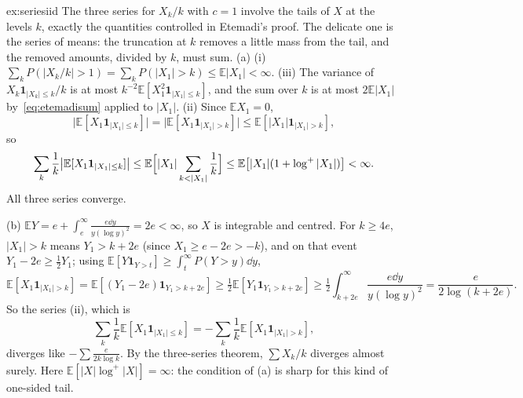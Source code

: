 \begin{solution}{ex:seriesiid}
\idea The three series for $X_k/k$ with $c=1$ involve the tails of $X$ at the levels $k$, exactly the quantities controlled in Etemadi's proof. The
delicate one is the series of means: the truncation at $k$ removes a little mass from the tail, and the removed amounts, divided by $k$, must sum.
\writeup (a) (i) $\sum_kP(|X_k/k|>1)=\sum_kP(|X_1|>k)\le\mathbb E|X_1|<\infty$. (iii) The variance of $X_k\mathbf 1_{|X_k|\le k}/k$ is at most $k^{-2}\mathbb E[X_1^2\mathbf 1_{|X_1|\le k}]$,
and the sum over $k$ is at most $2\mathbb E|X_1|$ by~\eqref{eq:etemadisum} applied to $|X_1|$. (ii) Since $\mathbb E X_1=0$,
\[
\bigl|\mathbb E[X_1\mathbf 1_{|X_1|\le k}]\bigr|=\bigl|\mathbb E[X_1\mathbf 1_{|X_1|>k}]\bigr|\le\mathbb E[|X_1|\mathbf 1_{|X_1|>k}],
\]
so
\[
\sum_k\frac1k\bigl|\mathbb E[X_1\mathbf 1_{|X_1|\le k}]\bigr|\le\mathbb E\Bigl[|X_1|\sum_{k<|X_1|}\frac1k\Bigr]\le\mathbb E\bigl[|X_1|(1+\log^+|X_1|)\bigr]<\infty.
\]
All three series converge.

(b) $\mathbb E Y=e+\int_e^\infty\frac{e\dd y}{y(\log y)^2}=2e<\infty$, so $X$ is integrable and centred. For $k\ge4e$, $|X_1|>k$ means $Y_1>k+2e$ (since $X_1\ge e-2e>-k$), and on that event
$Y_1-2e\ge\frac12Y_1$; using $\mathbb E[Y\mathbf 1_{Y>t}]\ge\int_t^\infty P(Y>y)\dd y$,
\[
\mathbb E[X_1\mathbf 1_{|X_1|>k}]=\mathbb E[(Y_1-2e)\mathbf 1_{Y_1>k+2e}]\ge\tfrac12\mathbb E[Y_1\mathbf 1_{Y_1>k+2e}]\ge\tfrac12\int_{k+2e}^\infty\frac{e\dd y}{y(\log y)^2}
=\frac e{2\log(k+2e)}.
\]
So the series (ii), which is
\[
\sum_k\frac1k\mathbb E[X_1\mathbf 1_{|X_1|\le k}]=-\sum_k\frac1k\mathbb E[X_1\mathbf 1_{|X_1|>k}],
\]
diverges like $-\sum\frac e{2k\log k}$. By the
three-series theorem, $\sum X_k/k$ diverges almost surely. Here $\mathbb E[|X|\log^+|X|]=\infty$: the condition of (a) is sharp for this kind of one-sided tail.
\end{solution}

